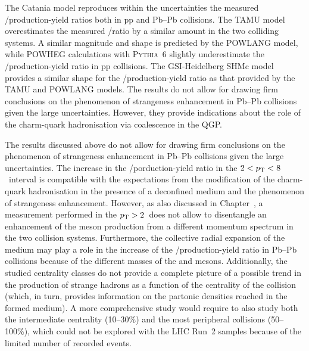 The Catania model reproduces within the uncertainties the measured \ds/\dz production-yield ratios both in pp and Pb--Pb collisions. The TAMU model overestimates the measured \ds/\dz ratio by a similar amount in the two colliding systems. A similar magnitude and \pt shape is predicted by the POWLANG model, while POWHEG calculations with \textsc{Pythia}~6 slightly underestimate the \ds/\dz production-yield ratio in pp collisions. The GSI-Heidelberg SHMc model provides a similar \pt shape for the \ds/\dz production-yield ratio as that provided by the TAMU and POWLANG models. The results do not allow for drawing firm conclusions on the phenomenon of strangeness enhancement in Pb--Pb collisions given the large uncertainties. However, they provide indications about the role of the charm-quark hadronisation via coalescence in the QGP.

The results discussed above do not allow for drawing firm conclusions on the phenomenon of strangeness enhancement in Pb--Pb collisions given the large uncertainties. The increase in the \ds/\dz porduction-yield ratio in the $2<p_\mathrm{T}<8$~\gevc interval is compatible with the expectations from the modification of the charm-quark hadronisation in the presence of a deconfined medium and the phenomenon of strangeness enhancement. However, as also discussed in Chapter~\cite{ch:PbPb}, a measurement performed in the $p_\mathrm{T}>2$~\gevc does not allow to disentangle an enhancement of the \ds meson production from a different momentum spectrum in the two collision systems. Furthermore, the collective radial expansion of the medium may play a role in the increase of the \ds/\dz production-yield ratio in Pb--Pb collisions because of the different masses of the \ds and \dz mesons. Additionally, the studied centrality classes do not provide a complete picture of a possible trend in the production of strange hadrons as a function of the centrality of the collision (which, in turn, provides information on the partonic densities reached in the formed medium). A more comprehensive study would require to also study both the intermediate centrality (10--30\%) and the most peripheral collisions (50--100\%), which could not be explored with the LHC Run~2 samples because of the limited number of recorded events.

